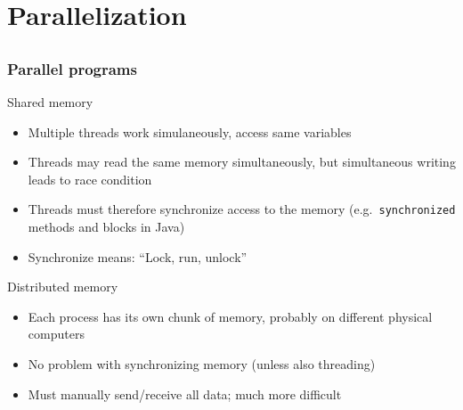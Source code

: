 \documentclass[usenames,dvipsnames,mathserif,compress]{beamer}
\begin{document}

\section*{Parallelization}
\subsection*{}


\begin{frame}
  \frametitle{Parallel programs}
  \begin{block}{Shared memory}
    \begin{itemize}
    \item Multiple threads work simulaneously, access same variables
    \item Threads may read the same memory simultaneously, but
      simultaneous writing leads to \alert{race condition}
    \item Threads must therefore \alert{synchronize} access to the memory
      (e.g.~\texttt{synchronized} methods and blocks in Java)
    \item Synchronize means: ``Lock, run, unlock''
    \end{itemize}
  \end{block}
  \begin{block}{Distributed memory}
    \begin{itemize}
    \item Each process has its own chunk of memory, probably on different physical computers
    \item No problem with synchronizing memory (unless also threading)
    \item Must manually send/receive all data; much more difficult
    \end{itemize}
  \end{block}
\end{frame}
\end{document}
